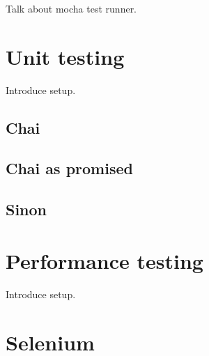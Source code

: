Talk about mocha test runner.

\section{Unit testing} {

	Introduce setup.

	\subsection{Chai} {

	}

	\subsection{Chai as promised} {
	
	}

	\subsection{Sinon} {

	}

}

\section{Performance testing} {

	Introduce setup.
	
	\section{Selenium} {

	}

}
